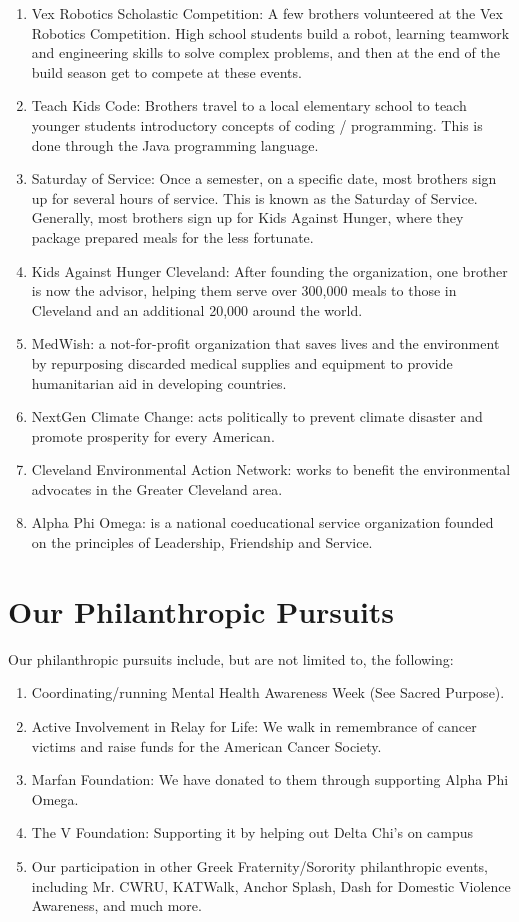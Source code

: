 \begin{enumerate}
      \item Vex Robotics Scholastic Competition: A few brothers volunteered at the Vex Robotics Competition. High school students build a robot, learning teamwork and engineering skills to solve complex problems, and then at the end of the build season get to compete at these events.
      \item Teach Kids Code: Brothers travel to a local elementary school to teach younger students introductory concepts of coding / programming. This is done through the Java programming language.
      \item Saturday of Service: Once a semester, on a specific date, most brothers sign up for several hours of service. This is known as the Saturday of Service. Generally, most brothers sign up for Kids Against Hunger, where they package prepared meals for the less fortunate.
      \item Kids Against Hunger Cleveland: After founding the organization, one brother is now the advisor, helping them serve over 300,000 meals to those in Cleveland and an additional 20,000 around the world.
      \item MedWish: a not-for-profit organization that saves lives and the environment by repurposing discarded medical supplies and equipment to provide humanitarian aid in developing countries. 
      \item NextGen Climate Change: acts politically to prevent climate disaster and promote prosperity for every American. 
      \item Cleveland Environmental Action Network: works to benefit the environmental advocates in the Greater Cleveland area.
      \item Alpha Phi Omega: is a national coeducational service organization founded on the principles of Leadership, Friendship and Service.
      
      \end{enumerate}
      
    \section*{Our Philanthropic Pursuits}
      Our philanthropic pursuits include, but are not limited to, the following:
      
      \begin{enumerate}
      	\item Coordinating/running Mental Health Awareness Week (See Sacred Purpose).      	
      	\item Active Involvement in Relay for Life: We walk in remembrance of cancer victims and raise funds for the American Cancer Society.
      	\item Marfan Foundation: We have donated to them through supporting Alpha Phi Omega.
      	\item The V Foundation: Supporting it by helping out Delta Chi's on campus
      	\item Our participation in other Greek Fraternity/Sorority philanthropic events, including Mr. CWRU, KATWalk, Anchor Splash, Dash for Domestic Violence Awareness, and much more.
      \end{enumerate}
      
